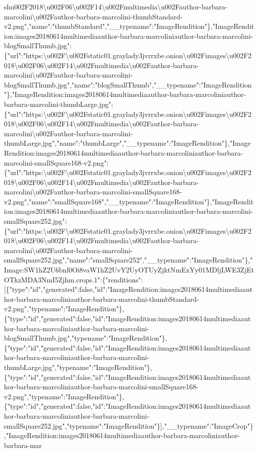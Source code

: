 sh{}u002F2018\textbackslash{}u002F06\textbackslash{}u002F14\textbackslash{}u002Fmultimedia\textbackslash{}u002Fauthor-barbara-marcolini\textbackslash{}u002Fauthor-barbara-marcolini-thumbStandard-v2.png","name":"thumbStandard","\_\_typename":"ImageRendition"\},"ImageRendition:images20180614multimediaauthor-barbara-marcoliniauthor-barbara-marcolini-blogSmallThumb.jpg":\{"url":"https:\textbackslash{}u002F\textbackslash{}u002Fstatic01.graylady3jvrrxbe.onion\textbackslash{}u002Fimages\textbackslash{}u002F2018\textbackslash{}u002F06\textbackslash{}u002F14\textbackslash{}u002Fmultimedia\textbackslash{}u002Fauthor-barbara-marcolini\textbackslash{}u002Fauthor-barbara-marcolini-blogSmallThumb.jpg","name":"blogSmallThumb","\_\_typename":"ImageRendition"\},"ImageRendition:images20180614multimediaauthor-barbara-marcoliniauthor-barbara-marcolini-thumbLarge.jpg":\{"url":"https:\textbackslash{}u002F\textbackslash{}u002Fstatic01.graylady3jvrrxbe.onion\textbackslash{}u002Fimages\textbackslash{}u002F2018\textbackslash{}u002F06\textbackslash{}u002F14\textbackslash{}u002Fmultimedia\textbackslash{}u002Fauthor-barbara-marcolini\textbackslash{}u002Fauthor-barbara-marcolini-thumbLarge.jpg","name":"thumbLarge","\_\_typename":"ImageRendition"\},"ImageRendition:images20180614multimediaauthor-barbara-marcoliniauthor-barbara-marcolini-smallSquare168-v2.png":\{"url":"https:\textbackslash{}u002F\textbackslash{}u002Fstatic01.graylady3jvrrxbe.onion\textbackslash{}u002Fimages\textbackslash{}u002F2018\textbackslash{}u002F06\textbackslash{}u002F14\textbackslash{}u002Fmultimedia\textbackslash{}u002Fauthor-barbara-marcolini\textbackslash{}u002Fauthor-barbara-marcolini-smallSquare168-v2.png","name":"smallSquare168","\_\_typename":"ImageRendition"\},"ImageRendition:images20180614multimediaauthor-barbara-marcoliniauthor-barbara-marcolini-smallSquare252.jpg":\{"url":"https:\textbackslash{}u002F\textbackslash{}u002Fstatic01.graylady3jvrrxbe.onion\textbackslash{}u002Fimages\textbackslash{}u002F2018\textbackslash{}u002F06\textbackslash{}u002F14\textbackslash{}u002Fmultimedia\textbackslash{}u002Fauthor-barbara-marcolini\textbackslash{}u002Fauthor-barbara-marcolini-smallSquare252.jpg","name":"smallSquare252","\_\_typename":"ImageRendition"\},"Image:SW1hZ2U6bnl0Oi8vaW1hZ2UvY2UyOTUyZjktNmExYy01MDljLWE3ZjEtOTkzMDA3NmI5Zjhm.crops.1":\{"renditions":{[}\{"type":"id","generated":false,"id":"ImageRendition:images20180614multimediaauthor-barbara-marcoliniauthor-barbara-marcolini-thumbStandard-v2.png","typename":"ImageRendition"\},\{"type":"id","generated":false,"id":"ImageRendition:images20180614multimediaauthor-barbara-marcoliniauthor-barbara-marcolini-blogSmallThumb.jpg","typename":"ImageRendition"\},\{"type":"id","generated":false,"id":"ImageRendition:images20180614multimediaauthor-barbara-marcoliniauthor-barbara-marcolini-thumbLarge.jpg","typename":"ImageRendition"\},\{"type":"id","generated":false,"id":"ImageRendition:images20180614multimediaauthor-barbara-marcoliniauthor-barbara-marcolini-smallSquare168-v2.png","typename":"ImageRendition"\},\{"type":"id","generated":false,"id":"ImageRendition:images20180614multimediaauthor-barbara-marcoliniauthor-barbara-marcolini-smallSquare252.jpg","typename":"ImageRendition"\}{]},"\_\_typename":"ImageCrop"\},"ImageRendition:images20180614multimediaauthor-barbara-marcoliniauthor-barbara-mar
